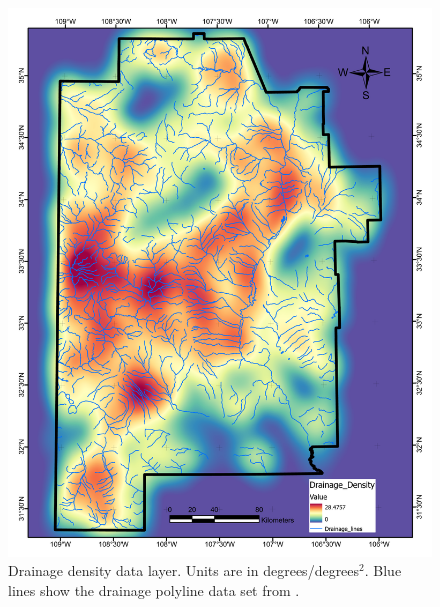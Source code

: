 \begin{figure}[H]
\centering
\includegraphics[width=0.75\linewidth]{templates/images/Figure-DrainageDensity.pdf}
\caption[Drainage density data layer]{Drainage density data layer. Units are in degrees/degrees$^2$. Blue lines show the drainage polyline data set from \protect\citet{bielicki_hydrogeolgic_2015}.}
\label{fig:feat_drainage}
\end{figure}
\pagebreak

